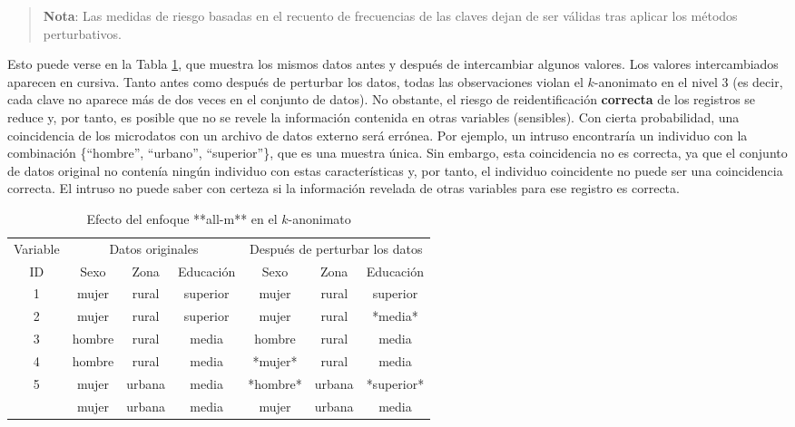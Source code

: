\documentclass[
]{book}
\theoremstyle{definition}
\theoremstyle{definition}
\theoremstyle{definition}
\theoremstyle{definition}
\theoremstyle{remark}
\begin{document}
\begin{quote}
\textbf{Nota}: Las medidas de riesgo basadas en el recuento de frecuencias de las claves dejan de ser válidas tras aplicar los métodos perturbativos.
\end{quote}

Esto puede verse en la Tabla \ref{tab:Tabla12}, que muestra los mismos datos antes y después de intercambiar algunos valores. Los valores intercambiados aparecen en cursiva. Tanto antes como después de perturbar los datos, todas las observaciones violan el \(k\)-anonimato en el nivel 3 (es decir, cada clave no aparece más de dos veces en el conjunto de datos). No obstante, el riesgo de reidentificación \textbf{correcta} de los registros se reduce y, por tanto, es posible que no se revele la información contenida en otras variables (sensibles). Con cierta probabilidad, una coincidencia de los microdatos con un archivo de datos externo será errónea. Por ejemplo, un intruso encontraría un individuo con la combinación \{``hombre'', ``urbano'', ``superior''\}, que es una muestra única. Sin embargo, esta coincidencia no es correcta, ya que el conjunto de datos original no contenía ningún individuo con estas características y, por tanto, el individuo coincidente no puede ser una coincidencia correcta. El intruso no puede saber con certeza si la información revelada de otras variables para ese registro es correcta.

\begin{table}

\caption{\label{tab:Tabla12}\label{tab:Tabla12}Efecto del enfoque **all-m** en el $k$-anonimato}
\centering
\begin{tabular}[t]{ccccccc}
\toprule
\multicolumn{1}{c}{Variable} & \multicolumn{3}{c}{Datos originales} & \multicolumn{3}{c}{Después de perturbar los datos} \\
\cmidrule(l{3pt}r{3pt}){1-1} \cmidrule(l{3pt}r{3pt}){2-4} \cmidrule(l{3pt}r{3pt}){5-7}
ID & Sexo & Zona & Educación & Sexo & Zona & Educación\\
\midrule
1 & mujer & rural & superior & mujer & rural & superior\\
2 & mujer & rural & superior & mujer & rural & *media*\\
3 & hombre & rural & media & hombre & rural & media\\
4 & hombre & rural & media & *mujer* & rural & media\\
5 & mujer & urbana & media & *hombre* & urbana & *superior*\\
\addlinespace
6 & mujer & urbana & media & mujer & urbana & media\\
\bottomrule
\end{tabular}
\end{table}
\end{document}
